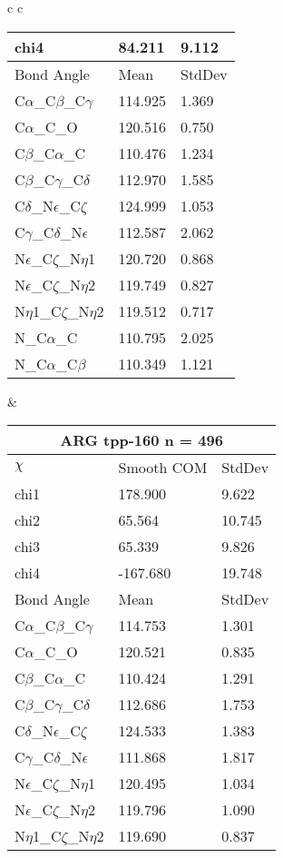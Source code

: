 \begin{longtable}{ c c }
\begin{tabular}{ l l l }
  chi4 & 84.211 & 9.112 \\ \midrule
  Bond Angle   & Mean     & StdDev \\ \midrule
  C$\alpha$\_C$\beta$\_C$\gamma$ & 114.925 & 1.369\\
  C$\alpha$\_C\_O & 120.516 & 0.750\\
  C$\beta$\_C$\alpha$\_C & 110.476 & 1.234\\
  C$\beta$\_C$\gamma$\_C$\delta$ & 112.970 & 1.585\\
  C$\delta$\_N$\epsilon$\_C$\zeta$ & 124.999 & 1.053\\
  C$\gamma$\_C$\delta$\_N$\epsilon$ & 112.587 & 2.062\\
  N$\epsilon$\_C$\zeta$\_N$\eta$1 & 120.720 & 0.868\\
  N$\epsilon$\_C$\zeta$\_N$\eta$2 & 119.749 & 0.827\\
  N$\eta$1\_C$\zeta$\_N$\eta$2 & 119.512 & 0.717\\
  N\_C$\alpha$\_C & 110.795 & 2.025\\
  N\_C$\alpha$\_C$\beta$ & 110.349 & 1.121\\
  \bottomrule
  \end{tabular}
  &
  \begin{tabular}{ l l l }
  \toprule
  \multicolumn{3}{c}{ARG \textbf{tpp-160} n = 496} \\ \toprule
  $\chi$       & Smooth COM & StdDev \\ \midrule
  chi1 & 178.900 & 9.622 \\ 
  chi2 & 65.564 & 10.745 \\ 
  chi3 & 65.339 & 9.826 \\ 
  chi4 & -167.680 & 19.748 \\ \midrule
  Bond Angle   & Mean     & StdDev \\ \midrule
  C$\alpha$\_C$\beta$\_C$\gamma$ & 114.753 & 1.301\\
  C$\alpha$\_C\_O & 120.521 & 0.835\\
  C$\beta$\_C$\alpha$\_C & 110.424 & 1.291\\
  C$\beta$\_C$\gamma$\_C$\delta$ & 112.686 & 1.753\\
  C$\delta$\_N$\epsilon$\_C$\zeta$ & 124.533 & 1.383\\
  C$\gamma$\_C$\delta$\_N$\epsilon$ & 111.868 & 1.817\\
  N$\epsilon$\_C$\zeta$\_N$\eta$1 & 120.495 & 1.034\\
  N$\epsilon$\_C$\zeta$\_N$\eta$2 & 119.796 & 1.090\\
  N$\eta$1\_C$\zeta$\_N$\eta$2 & 119.690 & 0.837\\

\end{tabular}
\end{longtable}
